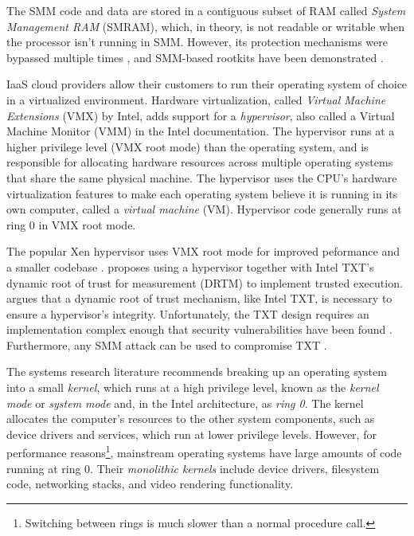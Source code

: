 The SMM code and data are stored in a contiguous subset of RAM called
\textit{System Management RAM} (SMRAM), which, in theory, is not readable or
writable when the processor isn't running in SMM. However, its protection
mechanisms were bypassed multiple times \cite{duflot2006smm}
\cite{rutkowska2008remap} \cite{wojtczuk2009smm}, and SMM-based rootkits have
been demonstrated \cite{wecherowski2009smm} \cite{embleton2010smm}.

IaaS cloud providers allow their customers to run their operating system of
choice in a virtualized environment. Hardware
virtualization\cite{uhlig2005vmx}, called \textit{Virtual Machine Extensions}
(VMX) by Intel, adds support for a \textit{hypervisor}, also called a
Virtual Machine Monitor (VMM) in the Intel documentation. The hypervisor runs
at a higher privilege level (VMX root mode) than the operating system, and is
responsible for allocating hardware resources across multiple operating systems
that share the same physical machine. The hypervisor uses the CPU's hardware
virtualization features to make each operating system believe it is running in
its own computer, called a \textit{virtual machine} (VM). Hypervisor code
generally runs at ring 0 in VMX root mode.

The popular Xen hypervisor uses VMX root mode for improved peformance and a
smaller codebase \cite{zhang2008xen}. \cite{mccune2010trustvisor} proposes
using a hypervisor together with Intel TXT's dynamic root of trust for
measurement (DRTM) to implement trusted execution.
\cite{vasudevan2010requirements} argues that a dynamic root of trust mechanism,
like Intel TXT, is necessary to ensure a hypervisor's integrity. Unfortunately,
the TXT design requires an implementation complex enough that security
vulnerabilities have been found \cite{wojtczuk2009txt2} \cite{wojtczuk2011txt}.
Furthermore, any SMM attack can be used to compromise TXT
\cite{wojtczuk2009txt}.

The systems research literature recommends breaking up an operating system into
a small \textit{kernel}, which runs at a high privilege level, known as the
\textit{kernel mode} or \textit{system mode} and, in the Intel architecture, as
\textit{ring 0}. The kernel allocates the computer's resources to the other
system components, such as device drivers and services, which run at lower
privilege levels. However, for performance reasons\footnote{Switching between
rings is much slower than a normal procedure call.}, mainstream operating
systems have large amounts of code running at ring 0. Their \textit{monolithic
kernels} include device drivers, filesystem code, networking stacks, and video
rendering functionality.


